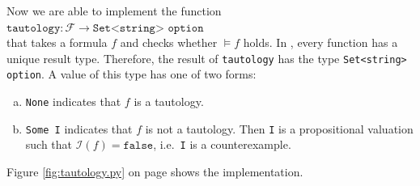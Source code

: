 Now we are able to implement the function 
\\[0.2cm]
\hspace*{1.3cm}
$\mathtt{tautology}: \mathcal{F} \rightarrow \texttt{Set<string> option}$
\\[0.2cm]
that takes a formula $f$ and checks whether $\models f$ holds.  In \Fsharp, every function has a unique
result type.  Therefore, the result of \texttt{tautology} has the type \texttt{Set<string> option}.  A value of
this type has one of two forms:
\begin{enumerate}[(a)]
\item \texttt{None} indicates that $f$ is a tautology.
\item \texttt{Some I} indicates that $f$ is not a tautology.  Then \texttt{I} is a propositional valuation
      such that $\mathcal{I}(f) = \texttt{false}$, i.e.~\texttt{I} is a counterexample.
\end{enumerate}
Figure \ref{fig:tautology.py} on page \pageref{fig:tautology.py}
shows the implementation.
